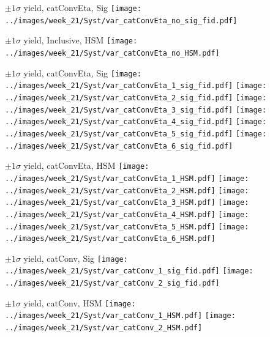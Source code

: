 \documentclass[10pt,UKenglish, leqno, xcolor = dvipsnames]{beamer}
\begin{document}
		\begin{frame}{$\pm1\sigma$ yield, catConvEta, Sig}
			\vfill
			\centering
			\texttt{[image: ../images/week\_21/Syst/var\_catConvEta\_no\_sig\_fid.pdf]}
			\vfill
		\end{frame}
		
		\begin{frame}{$\pm1\sigma$ yield, Inclusive, HSM}
			\vfill
			\centering
			\texttt{[image: ../images/week\_21/Syst/var\_catConvEta\_no\_HSM.pdf]}
			\vfill
		\end{frame}
		
		\begin{frame}{$\pm1\sigma$ yield, catConvEta, Sig}
			\vfill
			\centering
			\texttt{[image: ../images/week\_21/Syst/var\_catConvEta\_1\_sig\_fid.pdf]}
			\texttt{[image: ../images/week\_21/Syst/var\_catConvEta\_2\_sig\_fid.pdf]}
			\texttt{[image: ../images/week\_21/Syst/var\_catConvEta\_3\_sig\_fid.pdf]}	
			\texttt{[image: ../images/week\_21/Syst/var\_catConvEta\_4\_sig\_fid.pdf]}	
			\texttt{[image: ../images/week\_21/Syst/var\_catConvEta\_5\_sig\_fid.pdf]}
			\texttt{[image: ../images/week\_21/Syst/var\_catConvEta\_6\_sig\_fid.pdf]}
			\vfill
		\end{frame}
	
		\begin{frame}{$\pm1\sigma$ yield, catConvEta, HSM}
			\vfill
			\centering
			\texttt{[image: ../images/week\_21/Syst/var\_catConvEta\_1\_HSM.pdf]}
			\texttt{[image: ../images/week\_21/Syst/var\_catConvEta\_2\_HSM.pdf]}
			\texttt{[image: ../images/week\_21/Syst/var\_catConvEta\_3\_HSM.pdf]}	
			\texttt{[image: ../images/week\_21/Syst/var\_catConvEta\_4\_HSM.pdf]}	
			\texttt{[image: ../images/week\_21/Syst/var\_catConvEta\_5\_HSM.pdf]}
			\texttt{[image: ../images/week\_21/Syst/var\_catConvEta\_6\_HSM.pdf]}
			\vfill
		\end{frame}
	
		\begin{frame}{$\pm1\sigma$ yield, catConv, Sig}
			\vfill
			\centering
			\texttt{[image: ../images/week\_21/Syst/var\_catConv\_1\_sig\_fid.pdf]}
			\texttt{[image: ../images/week\_21/Syst/var\_catConv\_2\_sig\_fid.pdf]}
			\vfill
		\end{frame}
		
		\begin{frame}{$\pm1\sigma$ yield, catConv, HSM}
			\vfill
			\centering
			\texttt{[image: ../images/week\_21/Syst/var\_catConv\_1\_HSM.pdf]}
			\texttt{[image: ../images/week\_21/Syst/var\_catConv\_2\_HSM.pdf]}
			\vfill
		\end{frame}
		
\end{document}
